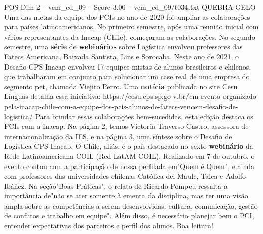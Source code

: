 \begin{textsample}{POS Dim 2 – vem\_ed\_09 – Score 3.00 – vem\_ed\_09/t034.txt}  \label{ex:f2_pos_174}
QUEBRA-GELO Uma das metas da equipe dos PCIs no ano de 2020 foi ampliar as colaborações para países latinoamericanos.
No primeiro semestre, após uma reunião inicial com vários representantes da Inacap (Chile), começaram as colaborações.
No segundo semestre, uma \textbf{série} de \textbf{webinários} sobre Logística envolveu professores das Fatecs Americana, Baixada Santista, Lins e Sorocaba.
Neste ano de 2021, o Desafio CPS-Inacap envolveu 17 equipes mistas de alunos brasileiros e chilenos, que trabalharam em conjunto para solucionar um case real de uma empresa do segmento pet, chamada Viejito Perro.
Uma \textbf{notícia} publicada no site Cesu Línguas detalha essa iniciativa: https://cesu.cps.sp.go v.br/em-evento-organizado-pela-inacap-chile-com-a-equipe-dos-pcis-alunos-de-fatecs-vencem-desafio-de-logistica/ Para brindar essas colaborações bem-sucedidas, esta edição destaca os PCIs com a Inacap.
Na página 2, temos Victoria Traverso Castro, assessora de internacionalização da IES, e na página 3, uma síntese sobre o Desafio de Logística CPS-Inacap.
O Chile, aliás, é o país destacado no sexto \textbf{webinário} da Rede Latinoamericana COIL (Red LatAM COIL).
Realizado em 7 de outubro, o evento contou com a participação de nossa perfilada em"Quem é Quem", e ainda com professores das universidades chilenas Católica del Maule, Talca e Adolfo Ibáñez.
Na seção"Boas Práticas", o relato de Ricardo Pompeu ressalta a importância de"não se ater somente à ementa da disciplina, mas ter uma visão ampla sobre as competências a serem desenvolvidas: cultura, comunicação, gestão de conflitos e trabalho em equipe".
Além disso, é necessário planejar bem o PCI, entender expectativas dos parceiros e perfil dos alunos.
Boa leitura!

\end{textsample}
